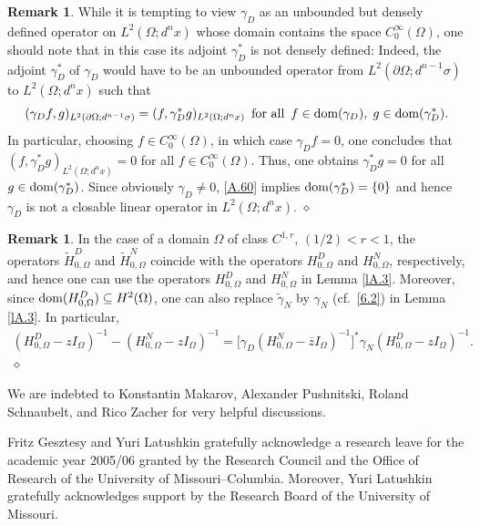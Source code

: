 \documentclass[reqno,10pt, centertags]{amsart}
\newcommand{\lb}{\label}
\newcommand{\ol}{\overline}
\newcommand{\wti}{\widetilde}
\newcommand{\ga}{\gamma}
\newcommand{\si}{\sigma}
\newcommand{\Om}{\Omega}
\newcommand{\dOm}{{\partial\Omega}}
\newcommand{\dom}{\text{\rm{dom}}}
\numberwithin{equation}{section}
\theoremstyle{definition}
\newtheorem{remark}[theorem]{Remark}
\begin{document}
\begin{remark} \lb{rA.4a}
While it is tempting to view $\ga_D$ as an unbounded but densely
defined operator on $L^2(\Om;d^nx)$ whose domain contains the space
$C_0^\infty(\Om)$, one should note that in this case its adjoint
$\ga_D^*$ is not densely defined: Indeed, the adjoint $\ga_D^*$ of $\ga_D$
would have to be an unbounded operator from $L^2(\dOm;d^{n-1}\si)$
to $L^2(\Om;d^nx)$ such that
\begin{equation}
(\ga_D f,g)_{L^2(\dOm;d^{n-1}\si)} = (f,\ga_D^* g)_{L^2(\Om;d^nx)}
\, \text{ for all }\, f\in\dom(\ga_D),\; g\in\dom(\ga_D^*).  \lb{A.60} 
\end{equation}
In particular, choosing $f\in C_0^\infty(\Om)$, in which case $\ga_D f =
0$, one concludes that $(f,\ga_D^* g)_{L^2(\Om;d^nx)}=0$ for
all $f\in C_0^\infty(\Om)$. Thus, one obtains $\ga_D^* g = 0$ for all
$g\in\dom(\ga_D^*)$. Since obviously $\gamma_D \neq 0$, \eqref{A.60}
implies $\dom(\gamma_D^*)=\{0\}$ and hence $\gamma_D$ is not a closable
linear operator in $L^2(\Om;d^nx)$. \hfill $\diamond$
\end{remark}

\begin{remark} \lb{rA.4}
In the case of a domain $\Om$ of class $C^{1,r}$, $(1/2)<r<1$, the
operators $\wti H^D_{0,\Om}$ and $\wti H^N_{0,\Om}$
coincide with the operators $H^D_{0,\Om}$ and $H^N_{0,\Om}$,
respectively, and hence one can use the operators $H^D_{0,\Om}$ and
$H^N_{0,\Om}$ in Lemma \ref{lA.3}. Moreover, since $\dom(H^D_{0,\Om})
\subseteq H^2(\Om)$, one can also replace $\wti\gamma_N$ by $\ga_N$
(cf.\ \eqref{6.2}) in Lemma \ref{lA.3}. In particular,
\begin{align} \lb{Na1-bis}
(H^D_{0,\Om}-zI_\Om)^{-1} - (H^N_{0,\Om}-zI_\Om)^{-1}
=\big[\ga_D(H^N_{0,\Om}-\ol{z}I_\Om)^{-1}\big]^*\gamma_N
(H^D_{0,\Om}-zI_\Om)^{-1}.
\end{align}
${}$ \hfill $\diamond$
\end{remark}


\medskip
{} We are indebted to Konstantin Makarov,
Alexander Pushnitski, Roland Schnaubelt, and Rico
Zacher for very helpful discussions.

Fritz Gesztesy and Yuri Latushkin gratefully acknowledge a
research leave for the academic year 2005/06 granted by the Research
Council and the Office of Research of the University of Missouri--Columbia.
Moreover, Yuri Latushkin gratefully acknowledges support by the Research
Board of the University of Missouri.
\end{document}
